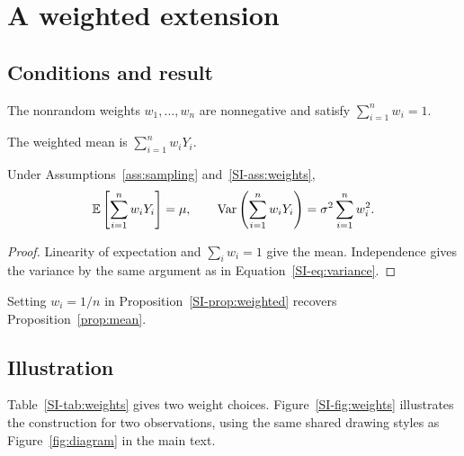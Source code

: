 \section{A weighted extension}\label{SI-sec:extension}

\subsection{Conditions and result}\label{SI-sec:weighted-result}

\begin{assumption}\label{SI-ass:weights}
The nonrandom weights $w_1,\ldots,w_n$ are nonnegative and satisfy $\sum_{i=1}^{n}w_i=1$.
\end{assumption}

\begin{definition}\label{SI-def:weighted}
The weighted mean is $\sum_{i=1}^{n}w_iY_i$.
\end{definition}

\begin{proposition}\label{SI-prop:weighted}
Under Assumptions~\ref{ass:sampling} and~\ref{SI-ass:weights},
\begin{equation}\label{SI-eq:weighted-moments}
\mathbb{E}\left[\sum_{i=1}^{n}w_iY_i\right]=\mu,
\qquad
\operatorname{Var}\left(\sum_{i=1}^{n}w_iY_i\right)=\sigma^2\sum_{i=1}^{n}w_i^2.
\end{equation}
\end{proposition}

\begin{proof}
Linearity of expectation and $\sum_i w_i=1$ give the mean. Independence gives the variance by the same argument as in Equation~\eqref{SI-eq:variance}.
\end{proof}

\begin{corollary}\label{SI-cor:equal}
Setting $w_i=1/n$ in Proposition~\ref{SI-prop:weighted} recovers Proposition~\ref{prop:mean}.
\end{corollary}

\clearpage
\subsection{Illustration}\label{SI-sec:illustration}

Table~\ref{SI-tab:weights} gives two weight choices. Figure~\ref{SI-fig:weights} illustrates the construction for two observations, using the same shared drawing styles as Figure~\ref{fig:diagram} in the main text.

